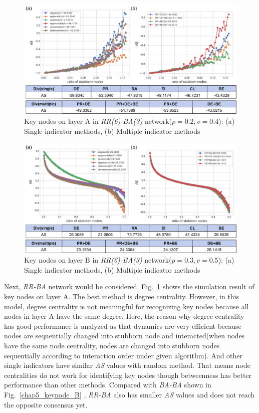 \begin{figure}[!htb]
	\centering
	\includegraphics[width=\hsize]{figure/chap5_keynode_RR_BA_A.png}
	\caption{Key nodes on layer A in \textit{RR(6)-BA(3)} network($p=0.2, v=0.4$):
		(a) Single indicator methods, (b) Multiple indicator methods}
	\label{chap5_keynode_RR_BA_A}
\end{figure}
\begin{figure}[!htb]
	\centering
	\includegraphics[width=\hsize]{figure/chap5_keynode_RR_BA_B.png}
	\caption{Key nodes on layer B in \textit{RR(6)-BA(3)} network($p=0.3, v=0.5$):
		(a) Single indicator methods, (b) Multiple indicator methods}
	\label{chap5_keynode_RR_BA_B}
\end{figure}

Next, \textit{RR-BA} network would be considered. Fig.~\ref{chap5_keynode_RR_BA_A} shows the simulation result of key nodes on layer A. The best method is degree centrality. However, in this model, degree centrality is not meaningful for recognizing key nodes because all nodes in layer A have the same degree. Here, the reason why degree centrality has good performance is analyzed as that dynamics are very efficient because nodes are sequentially changed into stubborn node and interacted(when nodes have the same node centrality, nodes are changed into stubborn nodes sequentially according to interaction order under given algorithm). And other single indicators have similar \textit{AS} values with random method. That means node centralities do not work for identifying key nodes though betweenness has better performance than other methods. Compared with \textit{BA-BA} shown in Fig.~\ref{chap5_keynode_B} , \textit{RR-BA} also has smaller \textit{AS} values and does not reach the opposite consensus yet. 


